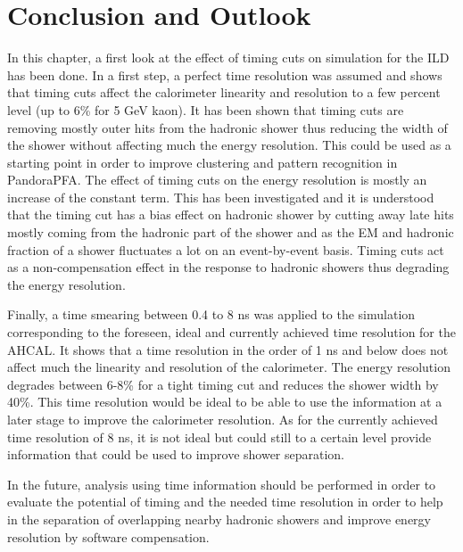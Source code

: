 \section{Conclusion and Outlook}

In this chapter, a first look at the effect of timing cuts on \geant simulation for the ILD has been done. In a first step, a perfect time resolution was assumed and shows that timing cuts affect the calorimeter linearity and resolution to a few percent level (up to 6\% for 5 GeV kaon). It has been shown that timing cuts are removing mostly outer hits from the hadronic shower thus reducing the width of the shower without affecting much the energy resolution. This could be used as a starting point in order to improve clustering and pattern recognition in PandoraPFA. The effect of timing cuts on the energy resolution is mostly an increase of the constant term. This has been investigated and it is understood that the timing cut has a bias effect on hadronic shower by cutting away late hits mostly coming from the hadronic part of the shower and as the EM and hadronic fraction of a shower fluctuates a lot on an event-by-event basis. Timing cuts act as a non-compensation effect in the response to hadronic showers thus degrading the energy resolution.

Finally, a time smearing between 0.4 to 8 ns was applied to the simulation corresponding to the foreseen, ideal and currently achieved time resolution for the AHCAL. It shows that a time resolution in the order of 1 ns and below does not affect much the linearity and resolution of the calorimeter. The energy resolution degrades between 6-8\% for a tight timing cut and reduces the shower width by 40\%. This time resolution would be ideal to be able to use the information at a later stage to improve the calorimeter resolution. As for the currently achieved time resolution of 8 ns, it is not ideal but could still to a certain level provide information that could be used to improve shower separation.

In the future, analysis using time information should be performed in order to evaluate the potential of timing and the needed time resolution in order to help in the separation of overlapping nearby hadronic showers and improve energy resolution by software compensation.
